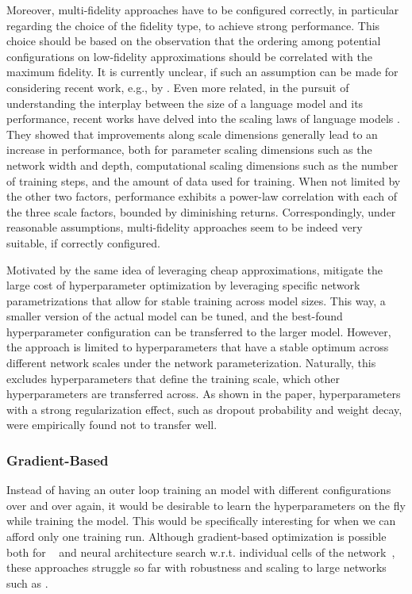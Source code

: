 Moreover, multi-fidelity approaches have to be configured correctly, in particular regarding the choice of the fidelity type, to achieve strong performance. This choice should be based on the observation that the ordering among potential configurations on low-fidelity approximations should be correlated with the maximum fidelity. It is currently unclear, if such an assumption can be made for \LLMs considering recent work, e.g., by \citet{kirsch-arxiv22a}.
Even more related, in the pursuit of understanding the interplay between the size of a language model and its performance, recent works have delved into the scaling laws of language models \cite{radford-openai19a, brown-neurips20a, kaplan-arxiv2020a}. 
They showed that improvements along scale dimensions generally lead to an increase in performance, both for parameter scaling dimensions such as the network width and depth, computational scaling dimensions such as the number of training steps, and the amount of data used for training.
When not limited by the other two factors, performance exhibits a power-law correlation with each of the three scale factors, bounded by diminishing returns. Correspondingly, under reasonable assumptions, multi-fidelity approaches seem to be indeed very suitable, if correctly configured.

Motivated by the same idea of leveraging cheap approximations, \citet{yang-neurips21a} mitigate the large cost of \LLM hyperparameter optimization by leveraging specific network parametrizations that allow for stable training across model sizes. 
This way, a smaller version of the actual model can be tuned, and the best-found hyperparameter configuration can be transferred to the larger model. 
However, the approach is limited to hyperparameters that have a stable optimum across different network scales under the network parameterization. 
Naturally, this excludes hyperparameters that define the training scale, which other hyperparameters are transferred across.
As shown in the paper, hyperparameters with a strong regularization effect, such as dropout probability and weight decay, were empirically found not to transfer well.

\subsubsection{Gradient-Based \AutoML}

Instead of having an outer loop training an \ML model with different configurations over and over again, it would be desirable to learn the hyperparameters on the fly while training the \ML model. This would be specifically interesting for \LLMs when we can afford only one training run. Although gradient-based optimization is possible both for \HPO~\cite{maclaurin-icml15a,luketina-icml16a,franceschi-icml17a,mackay-iclr19a,lorraine-aistats20a} and neural architecture search w.r.t. individual cells of the network~\cite{liu-iclr19a,elsken-jmlr19a}, these approaches struggle so far with robustness and scaling to large networks such as \LLMs.

